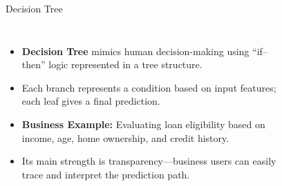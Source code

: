 \documentclass[aspectratio=169, table]{beamer}
\begin{document}
\begin{frame}{Decision Tree}
	\vspace{10pt}
	\begin{columns}
		\begin{itemize}
			\item \textbf{Decision Tree} mimics human decision-making using “if–then” logic represented in a tree structure.
			\item Each branch represents a condition based on input features; each leaf gives a final prediction.
			\item \textbf{Business Example:} Evaluating loan eligibility based on income, age, home ownership, and credit history.
			\item Its main strength is transparency—business users can easily trace and interpret the prediction path.
		\end{itemize}
		
		\begin{figure}
			\centering
		\end{figure}
	\end{columns}
\end{frame}
\end{document}
